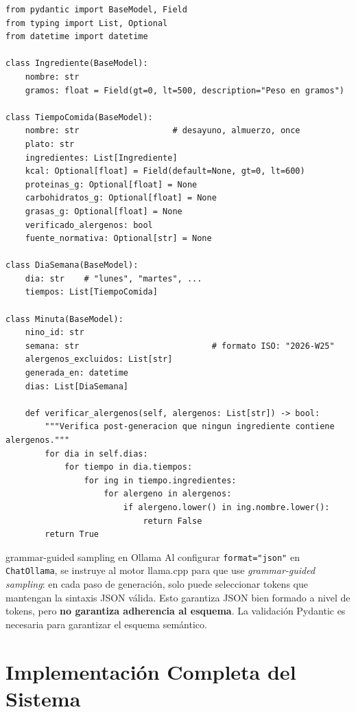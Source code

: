 \documentclass[12pt,a4paper]{article}
\begin{document}
\begin{lstlisting}[style=pythonstyle, caption={models.py --- Modelos Pydantic v2 para la minuta}]
from pydantic import BaseModel, Field
from typing import List, Optional
from datetime import datetime

class Ingrediente(BaseModel):
    nombre: str
    gramos: float = Field(gt=0, lt=500, description="Peso en gramos")

class TiempoComida(BaseModel):
    nombre: str                   # desayuno, almuerzo, once
    plato: str
    ingredientes: List[Ingrediente]
    kcal: Optional[float] = Field(default=None, gt=0, lt=600)
    proteinas_g: Optional[float] = None
    carbohidratos_g: Optional[float] = None
    grasas_g: Optional[float] = None
    verificado_alergenos: bool
    fuente_normativa: Optional[str] = None

class DiaSemana(BaseModel):
    dia: str    # "lunes", "martes", ...
    tiempos: List[TiempoComida]

class Minuta(BaseModel):
    nino_id: str
    semana: str                           # formato ISO: "2026-W25"
    alergenos_excluidos: List[str]
    generada_en: datetime
    dias: List[DiaSemana]

    def verificar_alergenos(self, alergenos: List[str]) -> bool:
        """Verifica post-generacion que ningun ingrediente contiene alergenos."""
        for dia in self.dias:
            for tiempo in dia.tiempos:
                for ing in tiempo.ingredientes:
                    for alergeno in alergenos:
                        if alergeno.lower() in ing.nombre.lower():
                            return False
        return True
\end{lstlisting}

\begin{conceptbox}{grammar-guided sampling en Ollama}
Al configurar \texttt{format="json"} en \texttt{ChatOllama}, se instruye
al motor llama.cpp para que use \textit{grammar-guided sampling}: en cada
paso de generación, solo puede seleccionar tokens que mantengan la sintaxis
JSON válida. Esto garantiza JSON bien formado a nivel de tokens, pero
\textbf{no garantiza adherencia al esquema}. La validación Pydantic es
necesaria para garantizar el esquema semántico.
\end{conceptbox}

\section{Implementación Completa del Sistema}
\label{sec:implementacion}
\end{document}
